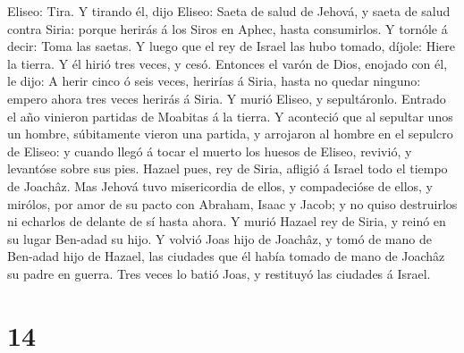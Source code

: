 Eliseo: Tira. Y tirando él, dijo Eliseo: Saeta de salud de Jehová, y
saeta de salud contra Siria: porque herirás á los Siros en Aphec, hasta
consumirlos.  Y tornóle á decir: Toma las saetas. Y luego
que el rey de Israel las hubo tomado, díjole: Hiere la tierra. Y él
hirió tres veces, y cesó.  Entonces el varón de Dios,
enojado con él, le dijo: A herir cinco ó seis veces, herirías á Siria,
hasta no quedar ninguno: empero ahora tres veces herirás á Siria.
 Y murió Eliseo, y sepultáronlo. Entrado el año vinieron
partidas de Moabitas á la tierra.  Y aconteció que al
sepultar unos un hombre, súbitamente vieron una partida, y arrojaron al
hombre en el sepulcro de Eliseo: y cuando llegó á tocar el muerto los
huesos de Eliseo, revivió, y levantóse sobre sus pies. 
Hazael pues, rey de Siria, afligió á Israel todo el tiempo de Joachâz.
 Mas Jehová tuvo misericordia de ellos, y compadecióse de
ellos, y mirólos, por amor de su pacto con Abraham, Isaac y Jacob; y no
quiso destruirlos ni echarlos de delante de sí hasta ahora.
 Y murió Hazael rey de Siria, y reinó en su lugar Ben-adad
su hijo.  Y volvió Joas hijo de Joachâz, y tomó de mano de
Ben-adad hijo de Hazael, las ciudades que él había tomado de mano de
Joachâz su padre en guerra. Tres veces lo batió Joas, y restituyó las
ciudades á Israel.

\hypertarget{section-13}{%
\section{14}\label{section-13}}

